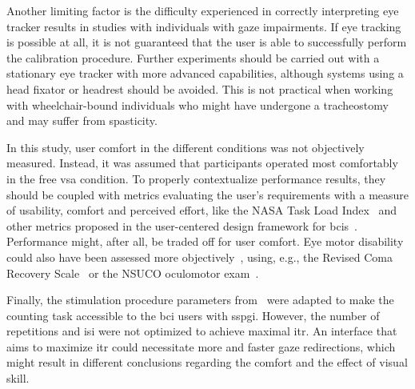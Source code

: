 Another limiting factor is the difficulty experienced in correctly interpreting eye
tracker results in studies with individuals with gaze impairments.
If eye tracking is possible at all, it is not guaranteed that the user is able
to successfully perform the calibration procedure.
Further experiments should be carried out with a stationary eye tracker with
more advanced capabilities, although systems using a head fixator or headrest
should be avoided.
This is not practical when working with
wheelchair-bound individuals who might have undergone a tracheostomy and may
suffer from spasticity.

In this study, user comfort in the different conditions was not objectively
measured.
Instead, it was assumed that participants operated most comfortably in the free
\ac{vsa} condition.
To properly contextualize performance results, they should be coupled with
metrics evaluating the user's requirements
with a measure of usability, comfort and perceived effort, like the NASA Task Load
Index~\cite{Hart2006} and other metrics proposed in the user-centered design
framework for \acp{bci}~\cite{Kuebler2014}.
Performance might, after all, be traded off for user comfort.
Eye motor disability could also have been assessed more
objectively~\cite{FriedOken2020}, using, e.g.,
the Revised Coma Recovery Scale~\cite{Giacino2004} or the NSUCO
oculomotor exam~\cite{Maples1992}.

Finally, the stimulation procedure parameters
from~\textcite{VanDenKerchove2024} were adapted to make the counting task
accessible to the \ac{bci} users with \ac{sspgi}.
However, the number of repetitions and \ac{isi} were not optimized to achieve
maximal \ac{itr}.
An interface that aims to maximize \ac{itr} could necessitate more and faster
gaze redirections, which might result in different conclusions regarding the
comfort and the effect of visual skill.

